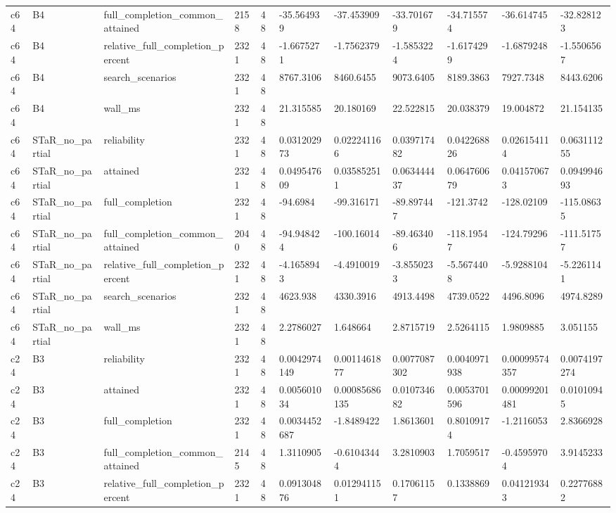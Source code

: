 \begin{longtable}{lllllllllll}
c64 & B4 & full\_completion\_common\_attained & 2158 & 48 & -35.564939 & -37.453909 & -33.701679 & -34.715574 & -36.614745 & -32.828123 \\
c64 & B4 & relative\_full\_completion\_percent & 2321 & 48 & -1.6675271 & -1.7562379 & -1.5853224 & -1.6174299 & -1.6879248 & -1.5506567 \\
c64 & B4 & search\_scenarios & 2321 & 48 & 8767.3106 & 8460.6455 & 9073.6405 & 8189.3863 & 7927.7348 & 8443.6206 \\
c64 & B4 & wall\_ms & 2321 & 48 & 21.315585 & 20.180169 & 22.522815 & 20.038379 & 19.004872 & 21.154135 \\
c64 & STaR\_no\_partial & reliability & 2321 & 48 & 0.031202973 & 0.022241166 & 0.039717482 & 0.042268826 & 0.026154114 & 0.063111255 \\
c64 & STaR\_no\_partial & attained & 2321 & 48 & 0.049547609 & 0.035852511 & 0.063444437 & 0.064760679 & 0.041570673 & 0.094994693 \\
c64 & STaR\_no\_partial & full\_completion & 2321 & 48 & -94.6984 & -99.316171 & -89.897447 & -121.3742 & -128.02109 & -115.08635 \\
c64 & STaR\_no\_partial & full\_completion\_common\_attained & 2040 & 48 & -94.948424 & -100.16014 & -89.463406 & -118.19547 & -124.79296 & -111.51757 \\
c64 & STaR\_no\_partial & relative\_full\_completion\_percent & 2321 & 48 & -4.1658943 & -4.4910019 & -3.8550233 & -5.5674408 & -5.9288104 & -5.2261141 \\
c64 & STaR\_no\_partial & search\_scenarios & 2321 & 48 & 4623.938 & 4330.3916 & 4913.4498 & 4739.0522 & 4496.8096 & 4974.8289 \\
c64 & STaR\_no\_partial & wall\_ms & 2321 & 48 & 2.2786027 & 1.648664 & 2.8715719 & 2.5264115 & 1.9809885 & 3.051155 \\
c24 & B3 & reliability & 2321 & 48 & 0.0042974149 & 0.0011461877 & 0.0077087302 & 0.0040971938 & 0.00099574357 & 0.0074197274 \\
c24 & B3 & attained & 2321 & 48 & 0.005601034 & 0.00085686135 & 0.010734682 & 0.0053701596 & 0.00099201481 & 0.01010945 \\
c24 & B3 & full\_completion & 2321 & 48 & 0.0034452687 & -1.8489422 & 1.8613601 & 0.80109174 & -1.2116053 & 2.8366928 \\
c24 & B3 & full\_completion\_common\_attained & 2145 & 48 & 1.3110905 & -0.61043444 & 3.2810903 & 1.7059517 & -0.45959704 & 3.9145233 \\
c24 & B3 & relative\_full\_completion\_percent & 2321 & 48 & 0.091304876 & 0.012941151 & 0.17061157 & 0.1338869 & 0.041219343 & 0.22776882 \\

\end{longtable}

